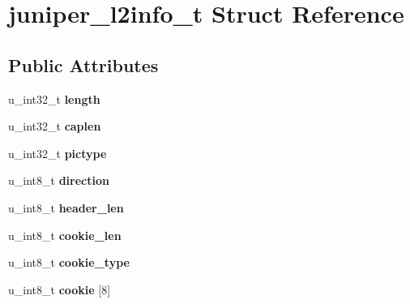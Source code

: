 \hypertarget{structjuniper__l2info__t}{
\section{juniper\_\-l2info\_\-t Struct Reference}
\label{structjuniper__l2info__t}
}
\subsection*{Public Attributes}
\begin{DoxyCompactItemize}
\item 
\hypertarget{structjuniper__l2info__t_a28c15a225da748ccc389393ce4987669}{
u\_\-int32\_\-t {\bfseries length}}
\label{structjuniper__l2info__t_a28c15a225da748ccc389393ce4987669}

\item 
\hypertarget{structjuniper__l2info__t_afa7579af49609776f4c83d6fbb480a1a}{
u\_\-int32\_\-t {\bfseries caplen}}
\label{structjuniper__l2info__t_afa7579af49609776f4c83d6fbb480a1a}

\item 
\hypertarget{structjuniper__l2info__t_a459a410727521296f83fabc931a2f16d}{
u\_\-int32\_\-t {\bfseries pictype}}
\label{structjuniper__l2info__t_a459a410727521296f83fabc931a2f16d}

\item 
\hypertarget{structjuniper__l2info__t_a417728b867311e7a6a9486182772472e}{
u\_\-int8\_\-t {\bfseries direction}}
\label{structjuniper__l2info__t_a417728b867311e7a6a9486182772472e}

\item 
\hypertarget{structjuniper__l2info__t_afe261da88ba9a7a2fef9ec222b2eb698}{
u\_\-int8\_\-t {\bfseries header\_\-len}}
\label{structjuniper__l2info__t_afe261da88ba9a7a2fef9ec222b2eb698}

\item 
\hypertarget{structjuniper__l2info__t_ae71c6ce3d9b0c6542d5e5168a250af18}{
u\_\-int8\_\-t {\bfseries cookie\_\-len}}
\label{structjuniper__l2info__t_ae71c6ce3d9b0c6542d5e5168a250af18}

\item 
\hypertarget{structjuniper__l2info__t_af793831a210a2905d04acbe54b57914d}{
u\_\-int8\_\-t {\bfseries cookie\_\-type}}
\label{structjuniper__l2info__t_af793831a210a2905d04acbe54b57914d}

\item 
\hypertarget{structjuniper__l2info__t_a0531591309f8facb6e89932af70faf46}{
u\_\-int8\_\-t {\bfseries cookie} \mbox{[}8\mbox{]}}
\label{structjuniper__l2info__t_a0531591309f8facb6e89932af70faf46}


\end{DoxyCompactItemize}
